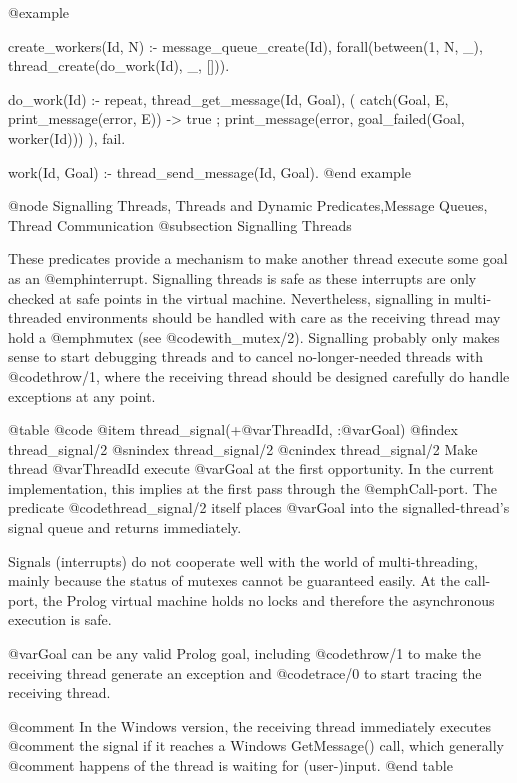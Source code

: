 @example
%    

create_workers(Id, N) :-
    message_queue_create(Id),
    forall(between(1, N, _),
           thread_create(do_work(Id), _, [])).

do_work(Id) :-
    repeat,
      thread_get_message(Id, Goal),
      (   catch(Goal, E, print_message(error, E))
      ->  true
      ;   print_message(error, goal_failed(Goal, worker(Id)))
      ),
    fail.

%    

work(Id, Goal) :-
    thread_send_message(Id, Goal).
@end example

@node Signalling Threads, Threads and Dynamic Predicates,Message Queues, Thread Communication
@subsection Signalling Threads

These predicates provide a mechanism to make another thread execute some
goal as an @emph{interrupt}.  Signalling threads is safe as these
interrupts are only checked at safe points in the virtual machine.
Nevertheless, signalling in multi-threaded environments should be
handled with care as the receiving thread may hold a @emph{mutex}
(see @code{with_mutex/2}).  Signalling probably only makes sense to start
debugging threads and to cancel no-longer-needed threads with @code{throw/1},
where the receiving thread should be designed carefully do handle
exceptions at any point.

@table @code
@item thread_signal(+@var{ThreadId}, :@var{Goal})
@findex thread_signal/2
@snindex thread_signal/2
@cnindex thread_signal/2
Make thread @var{ThreadId} execute @var{Goal} at the first
opportunity.  In the current implementation, this implies at the first
pass through the @emph{Call-port}. The predicate @code{thread_signal/2}
itself places @var{Goal} into the signalled-thread's signal queue
and returns immediately.

Signals (interrupts) do not cooperate well with the world of
multi-threading, mainly because the status of mutexes cannot be
guaranteed easily.  At the call-port, the Prolog virtual machine
holds no locks and therefore the asynchronous execution is safe.

@var{Goal} can be any valid Prolog goal, including @code{throw/1} to make
the receiving thread generate an exception and @code{trace/0} to start
tracing the receiving thread.

@comment In the Windows version, the receiving thread immediately executes
@comment the signal if it reaches a Windows GetMessage() call, which generally
@comment happens of the thread is waiting for (user-)input.
@end table

